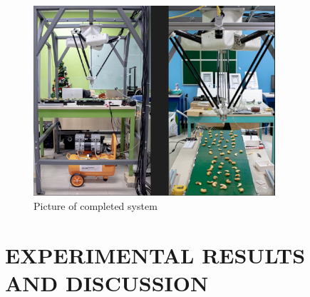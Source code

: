 \documentclass[10pt, letterpaper]{article}
\begin{document}
    \begin{figure}[h]
        \centering
        \includegraphics[width=0.8\textwidth]{fig19.JPG}
        \caption{Picture of completed system}
    \end{figure}

\section{EXPERIMENTAL RESULTS AND DISCUSSION}
\end{document}
